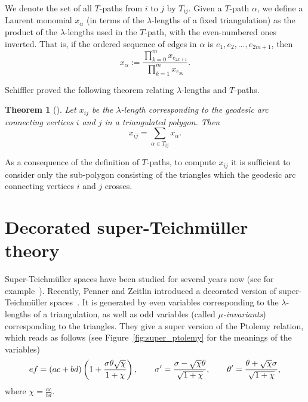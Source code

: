 \documentclass[11pt]{article}
\numberwithin{equation}{section}
\numberwithin{equation}{section}
\newtheorem{Theorem}{Theorem}[section]
\begin{document}
We denote the set of all $T$-paths from $i$ to $j$ by $T_{ij}$. Given a $T$-path $\alpha$,
we define a Laurent monomial $x_\alpha$ (in terms of the $\lambda$-lengths of a fixed triangulation) as
the product of the $\lambda$-lengths used in the $T$-path, with the even-numbered ones inverted. That is,
if the ordered sequence of edges in $\alpha$ is $e_1, e_2, \dots, e_{2m+1}$, then
\[ x_\alpha := \frac{\prod_{k=0}^m x_{e_{2k+1}}}{\prod_{k=1}^m x_{e_{2k}}}. \]

Schiffler proved the following theorem relating $\lambda$-lengths and $T$-paths.

\begin{Theorem}[{\cite[Theorem 1.2]{schiffler_08}}] Let $x_{ij}$ be the $\lambda$-length corresponding to the geodesic arc
 connecting vertices $i$ and $j$ in a triangulated polygon. Then
 \[ x_{ij} = \sum_{\alpha \in T_{ij}} x_\alpha. \]
\end{Theorem}

\begin{Remark} \label{rem:subtriang}\rm
As a consequence of the definition of $T$-paths, to compute $x_{ij}$ it is sufficient to consider only the sub-polygon consisting of the
triangles which the geodesic arc connecting vertices $i$ and $j$ crosses.
\end{Remark}

\section{Decorated super-Teichm\"{u}ller theory}\label{sec:dec_super}

Super-Teichm\"{u}ller spaces have been studied for several years now (see for example~\cite{cr_88}).
Recently, Penner and Zeitlin introduced a decorated version of super-Teichm\"{u}ller spaces~\cite{pz_19}.
It is generated by even variables corresponding to the
$\lambda$-lengths of a triangulation, as well as odd variables (called \emph{$\mu$-invariants}) corresponding to the triangles. They give
a super version of the Ptolemy relation, which reads as follows (see Figure~\ref{fig:super_ptolemy} for the meanings of the variables)
\begin{gather*}
 ef = (ac+bd)\left( 1+{{\sigma\theta\sqrt{\chi}}\over{1+\chi}}\right),\qquad
 \sigma' = {{\sigma-\sqrt{\chi}\theta}\over{\sqrt{1+\chi}}},\qquad
 \theta' = {{\theta+\sqrt{\chi}\sigma}\over{\sqrt{1+\chi}}},
\end{gather*}
where $ \chi = \frac{ac}{bd}$.
\end{document}
